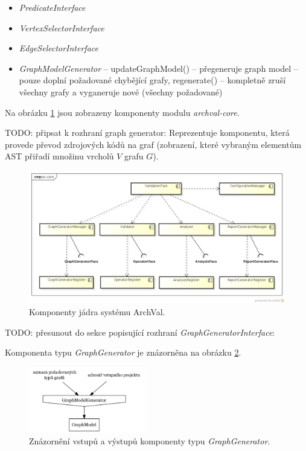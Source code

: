 \begin{itemize}
\item \emph{PredicateInterface}
\item \emph{VertexSelectorInterface}
\item \emph{EdgeSelectorInterface}

\item \emph{GraphModelGenerator} -- updateGraphModel() -- přegeneruje graph model -- pouze doplní požadované chybějící grafy, regenerate() -- kompletně zruší všechny grafy a vyganeruje nové (všechny požadované)
\end{itemize}

Na obrázku \ref{design-archval_core} jsou zobrazeny komponenty modulu \emph{archval-core}.

TODO: připsat k rozhraní graph generator: Reprezentuje komponentu, která provede převod zdrojových kódů na graf (zobrazení, které vybraným elementům AST přiřadí množinu vrcholů $V$ grafu $G$).

\begin{figure}[h!]
  \centering
  \includegraphics[width=1.0\textwidth]{./uml/archval_core_cmp.png}
  \caption{Komponenty jádra systému ArchVal.\label{design-archval_core}}
\end{figure}

TODO: přesunout do sekce popisující rozhraní \emph{GraphGeneratorInterface}:

Komponenta typu \emph{GraphGenerator} je znázorněna na obrázku \ref{design-graph_generator_io}.

\begin{figure}[h!]
  \centering
  \includegraphics[width=0.45\textwidth]{./graphs/graph_generator_io_graph.png}
  \caption{Znázornění vstupů a výstupů komponenty typu \emph{GraphGenerator}.\label{design-graph_generator_io}}
\end{figure}

